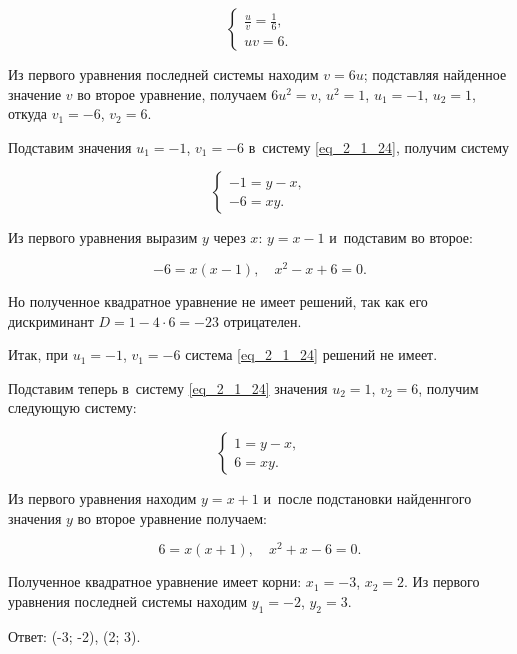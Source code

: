 \begin{equation*}
\begin{cases}
\displaystyle \frac{u}{v} = \frac{1}{6}, \\[10pt]
uv = 6.
\end{cases}
\end{equation*}

Из первого уравнения последней системы находим $v = 6u$;
подставляя найденное значение $v$ во второе уравнение,
получаем $6u^{2} = v$, $u^{2} = 1$, $u_{1} = -1$, $u_{2} = 1$,
откуда $v_{1} = -6$, $v_{2} = 6$.

Подставим значения $u_{1} = -1$, $v_{1} = -6$ в~систему \eqref{eq_2_1_24},
получим систему

\begin{equation*}
\begin{cases}
-1 = y - x, \\
-6 = xy.
\end{cases}
\end{equation*}

Из первого уравнения выразим $y$ через $x$: $y = x - 1$ и~подставим во второе:

\begin{equation*}
-6 = x(x - 1), \quad
x^{2} - x + 6 = 0.
\end{equation*}

Но полученное квадратное уравнение не имеет решений, так как его дискриминант
$D = 1 -4 \cdot 6 = -23$ отрицателен.

Итак, при $u_{1} = -1$, $v_{1} = -6$ система \eqref{eq_2_1_24} решений не имеет.

Подставим теперь в~систему \eqref{eq_2_1_24} значения $u_{2} = 1$, $v_{2} = 6$,
получим следующую систему:

\begin{equation*}
\begin{cases}
1 = y - x, \\
6 = xy.
\end{cases}
\end{equation*}

Из первого уравнения находим $y = x + 1$ и~после подстановки найденнгого значения
$y$ во второе уравнение получаем:

\begin{equation*}
6 = x(x + 1), \quad
x^{2} + x - 6 = 0.
\end{equation*}

Полученное квадратное уравнение имеет корни: $x_{1} = -3$, $x_{2} = 2$.
Из первого уравнения последней системы находим $y_{1} = -2$, $y_{2} = 3$.

Ответ: (-3; -2), (2; 3).

